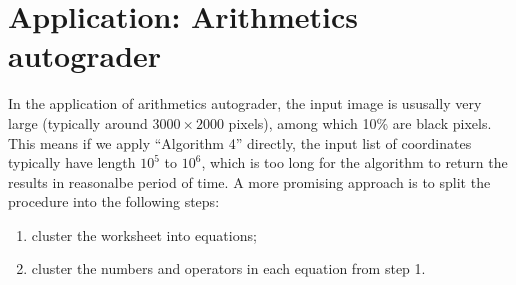 
\section{Application: Arithmetics autograder}
In the application of arithmetics autograder, the input image is ususally very large (typically around \(3000\times2000\) pixels), among which 10\% are black pixels.
This means if we apply ``Algorithm 4'' directly, the input list of coordinates typically have length \(10^5\) to \(10^6\), which is too long for the algorithm to return the results in reasonalbe period of time.
A more promising approach is to split the procedure into the following steps:
\begin{enumerate}
    \vspace{-0.5em}
    \item cluster the worksheet into equations;
    \vspace{-0.5em}
    \item cluster the numbers and operators in each equation from step 1.
\end{enumerate}


